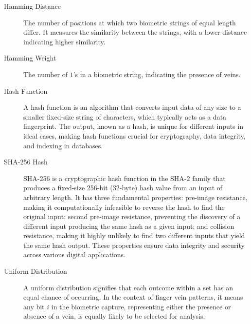 \begin{description}
    \item[Hamming Distance] \label{def:Hamming Distance} The number of positions at which two biometric strings of equal length differ. It measures the similarity between the strings, with a lower distance indicating higher similarity.

    \item[Hamming Weight] \label{def:Hamming Weight} The number of \(1\)'s in a biometric string, indicating the presence of veins.

    \item[Hash Function] \label{def:Hash_Function} A hash function is an algorithm that converts input data of any size to a smaller fixed-size string of characters, which typically acts as a data fingerprint. The output, known as a hash, is unique for different inputs in ideal cases, making hash functions crucial for cryptography, data integrity, and indexing in databases.

    \item[SHA-256 Hash] \label{def:SHA-256} SHA-256 is a cryptographic hash function in the SHA-2 family that produces a fixed-size 256-bit (32-byte) hash value from an input of arbitrary length. It has three fundamental properties: pre-image resistance, making it computationally infeasible to reverse the hash to find the original input; second pre-image resistance, preventing the discovery of a different input producing the same hash as a given input; and collision resistance, making it highly unlikely to find two different inputs that yield the same hash output. These properties ensure data integrity and security across various digital applications.

    \item[Uniform Distribution] \label{def:Uniform Distribution} A uniform distribution signifies that each outcome within a set has an equal chance of occurring. In the context of finger vein patterns, it means any bit \(i\) in the biometric capture, representing either the presence or absence of a vein, is equally likely to be selected for analysis.

\end{description}
